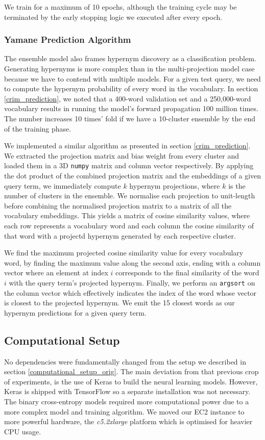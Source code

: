 We train for a maximum of 10 epochs, although the training cycle may be terminated by the early stopping logic we executed after every epoch.

\subsubsection{Yamane Prediction Algorithm} \label{yamane_prediction}
The ensemble model also frames hypernym discovery as a classification problem.  Generating hypernyms is more complex than in the multi-projection model case because we have to contend with multiple models.  For a given test query, we need to compute the 
hypernym probability of every word in the vocabulary.  In section \ref{crim_prediction}, we noted that a 400-word validation set and a 250,000-word vocabulary results in running the model's forward propagation 100 million times.  The number increases 10 times' fold if we have a 10-cluster ensemble by the end of the training phase.  

We implemented a similar algorithm as presented in section \ref{crim_prediction}.  We extracted the projection matrix and bias weight from every cluster and loaded them in a 3D \texttt{numpy} matrix and column vector respectively.  By applying the dot product of the combined projection matrix and the embeddings of a given query term, we immediately compute $k$ hypernym projections, where $k$ is the number of clusters in the ensemble.  We normalise each projection to unit-length before combining the normalised projection matrix to a matrix of all the vocabulary embeddings.  This yields a matrix of cosine similarity values, where each row represents a vocabulary word and each column the cosine similarity of that word with a projectd hypernym generated by each respective cluster.

We find the maximum projected cosine similarity value for every vocabulary word, by finding the maximum value along the second axis, ending with a column vector where an element at index $i$ corresponds to the final similarity of the word $i$ with the query term's projected hypernym.  Finally, we perform an \texttt{argsort} on the column vector which effectively indicates the index of the word whose vector is closest to the projected hypernym.  We emit the 15 closest words as our hypernym predictions for a given query term.

\subsection{Computational Setup}
No dependencies were fundamentally changed from the setup we described in section \ref{computational_setup_orig}.  The main deviation from that previous crop of experiments, is the use of Keras to build the neural learning models.  However, Keras is shipped with TensorFlow so a separate installation was not necessary.  The binary cross-entropy models required more computational power due to a more complex model and training algorithm.  We moved our EC2 instance to more powerful hardware, the \textit{c5.2xlarge} platform which is optimised for heavier CPU usage.


